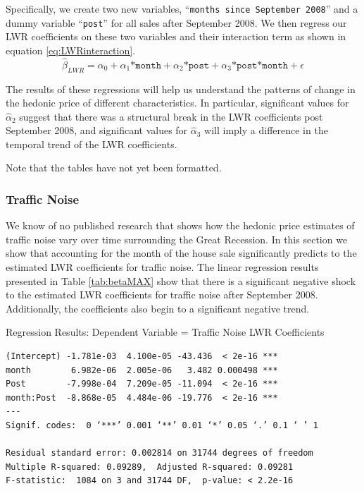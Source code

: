 \documentclass{article}\usepackage{graphicx, color}
\begin{document}
Specifically, we create two new variables, ``\texttt{months since September 2008}'' and a dummy variable ``\texttt{post}'' for all sales after September 2008. We then regress our LWR coefficients on these two variables and their interaction term as shown in equation \eqref{eq:LWRinteraction}. 
\begin{equation}\label{eq:LWRinteraction}
\hat{\beta}_{LWR} = \alpha _0 + \alpha _1 \texttt{*month} + \alpha _2  \texttt{*post} + \alpha _3 \texttt{*post*month} + \epsilon
\end{equation}

The results of these regressions will help us understand the patterns of change in the hedonic price of different characteristics. In particular, significant values for $\hat{\alpha}_2$ suggest that there was a structural break in the LWR coefficients post September 2008, and significant values for $\hat{\alpha}_3$ will imply a difference in the temporal trend of the LWR coefficients. 

Note that the tables have not yet been formatted.

\subsubsection{Traffic Noise}

We know of no published research that shows how the hedonic price estimates of traffic noise vary over time surrounding the Great Recession. In this section we show that accounting for the month of the house sale significantly predicts to the estimated LWR coefficients for traffic noise. The linear regression results presented in Table \ref{tab:betaMAX} show that there is a significant negative shock to the estimated LWR coefficients for traffic noise after September 2008. Additionally, the coefficients also begin to a significant negative trend.
\begin{table}[h]
\caption{Regression Results: Dependent Variable = Traffic Noise LWR Coefficients}\label{tab:betaMAX}
\begin{verbatim}
(Intercept) -1.781e-03  4.100e-05 -43.436  < 2e-16 ***
month        6.982e-06  2.005e-06   3.482 0.000498 ***
Post        -7.998e-04  7.209e-05 -11.094  < 2e-16 ***
month:Post  -8.868e-05  4.484e-06 -19.776  < 2e-16 ***
---
Signif. codes:  0 ‘***’ 0.001 ‘**’ 0.01 ‘*’ 0.05 ‘.’ 0.1 ‘ ’ 1 

Residual standard error: 0.002814 on 31744 degrees of freedom
Multiple R-squared: 0.09289,  Adjusted R-squared: 0.09281 
F-statistic:  1084 on 3 and 31744 DF,  p-value: < 2.2e-16 
\end{verbatim}
\end{table}
\end{document}
